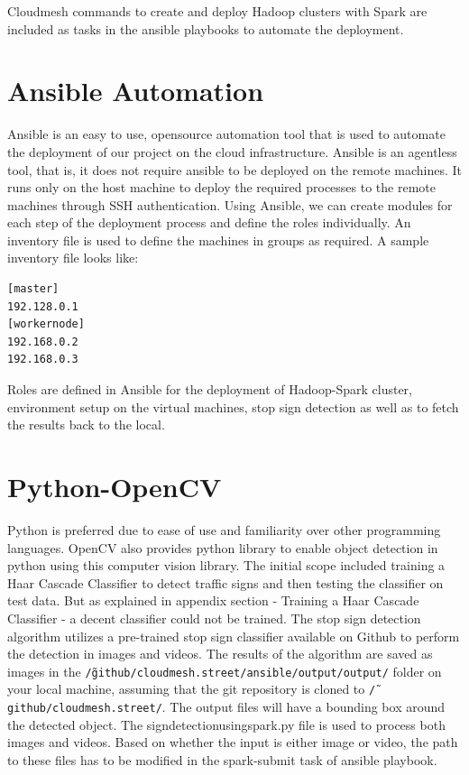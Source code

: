 \documentclass[9pt,twocolumn,twoside]{../../styles/osajnl}
\begin{document}
Cloudmesh commands to create and deploy Hadoop clusters with Spark are
included as tasks in the ansible playbooks to automate the deployment.

\section{Ansible Automation}
Ansible is an easy to use, opensource automation tool that is used to
automate the deployment of our project on the cloud
infrastructure. Ansible is an agentless tool, that is, it does not
require ansible to be deployed on the remote machines. It runs only on
the host machine to deploy the required processes to the remote
machines through SSH authentication.  Using Ansible, we can create
modules for each step of the deployment process and define the roles
individually. An inventory file is used to define the machines in
groups as required. A sample inventory file looks like:
\begin{verbatim} 
[master] 
192.128.0.1 
[workernode] 
192.168.0.2 
192.168.0.3
\end{verbatim}

Roles are defined in Ansible for the deployment of Hadoop-Spark
cluster, environment setup on the virtual machines, stop sign
detection as well as to fetch the results back to the local.

\section{Python-OpenCV}

Python is preferred due to ease of use and familiarity over other
programming languages. OpenCV also provides python library to enable
object detection in python using this computer vision library. The
initial scope included training a Haar Cascade Classifier to detect
traffic signs and then testing the classifier on test data. But as
explained in appendix section - Training a Haar Cascade Classifier - a
decent classifier could not be trained. The stop sign detection
algorithm utilizes a pre-trained stop sign classifier available on
Github to perform the detection in images and videos. The results of
the algorithm are saved as images in the
\texttt{\~/github/cloudmesh.street/ansible/output/output/} folder on
your local machine, assuming that the git repository is cloned to
\texttt{\~/github/cloudmesh.street/}. The output files will have a
bounding box around the detected object. The
signdetectionusingspark.py file is used to process both images and
videos. Based on whether the input is either image or video, the path
to these files has to be modified in the spark-submit task of ansible
playbook.
\end{document}
